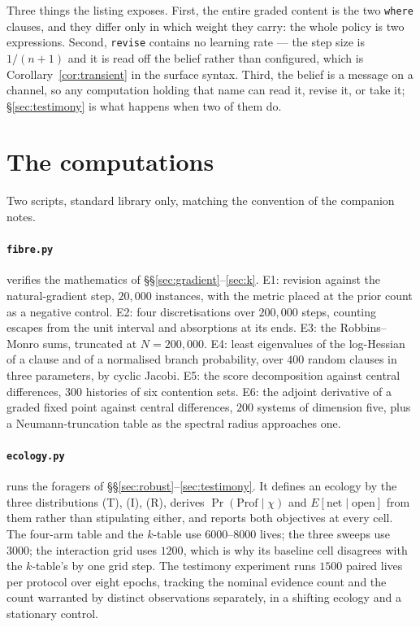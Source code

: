 \documentclass[11pt,a4paper]{article}
\theoremstyle{plain}
\theoremstyle{definition}
\theoremstyle{remark}
\begin{document}
Three things the listing exposes. First, the entire graded content is the two
\texttt{where} clauses, and they differ only in which weight they carry: the whole
policy is two expressions. Second, \texttt{revise} contains no learning rate ---
the step size is $1/(n+1)$ and it is read off the belief rather than configured,
which is Corollary~\ref{cor:transient} in the surface syntax. Third, the belief is
a message on a channel, so any computation holding that name can read it, revise
it, or take it; \S\ref{sec:testimony} is what happens when two of them do.

\section{The computations}\label{app:computations}

Two scripts, standard library only, matching the convention of the companion
notes.

\paragraph{\texttt{fibre.py}} verifies the mathematics of
\S\S\ref{sec:gradient}--\ref{sec:k}. E1: revision against the natural-gradient
step, $20{,}000$ instances, with the metric placed at the prior count as a
negative control. E2: four discretisations over $200{,}000$ steps, counting
escapes from the unit interval and absorptions at its ends. E3: the
Robbins--Monro sums, truncated at $N = 200{,}000$. E4: least eigenvalues of the
log-Hessian of a clause and of a normalised branch probability, over $400$ random
clauses in three parameters, by cyclic Jacobi. E5: the score decomposition against
central differences, $300$ histories of six contention sets. E6: the adjoint
derivative of a graded fixed point against central differences, $200$ systems of
dimension five, plus a Neumann-truncation table as the spectral radius approaches
one.

\paragraph{\texttt{ecology.py}} runs the foragers of
\S\S\ref{sec:robust}--\ref{sec:testimony}. It defines an ecology by the three
distributions (T), (I), (R), derives $\Pr(\mathrm{Prof}\mid\chi)$ and
$E[\text{net}\mid\text{open}]$ from them rather than stipulating either, and
reports both objectives at every cell. The four-arm table and the $k$-table use
$6000$--$8000$ lives; the three sweeps use $3000$; the interaction grid uses
$1200$, which is why its baseline cell disagrees with the $k$-table's by one grid
step. The testimony experiment runs $1500$ paired lives per protocol over eight
epochs, tracking the nominal evidence count and the count warranted by distinct
observations separately, in a shifting ecology and a stationary control.
\end{document}

